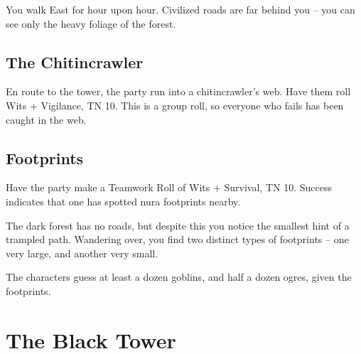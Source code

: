 \begin{multicols}{2}
\begin{boxtext}
  \noindent
  You walk East for hour upon hour.
  Civilized roads are far behind you -- you can see only the heavy foliage of the forest.

\end{boxtext}


\subsection{The Chitincrawler}

En route to the tower, the party run into a chitincrawler's web.
Have them roll Wits + Vigilance, TN 10.
This is a group roll, so everyone who fails has been caught in the web.

\chitincrawler

\subsection{Footprints}

Have the party make a Teamwork Roll of Wits + Survival, TN 10.
Success indicates that one has spotted nura footprints nearby.

\begin{boxtext}

  The dark forest has no roads, but despite this you notice the smallest hint of a trampled path.
  Wandering over, you find two distinct types of footprints -- one very large, and another very small.

\end{boxtext}

The characters guess at least a dozen goblins, and half a dozen ogres, given the footprints.

\end{multicols}

\section{The Black Tower}

